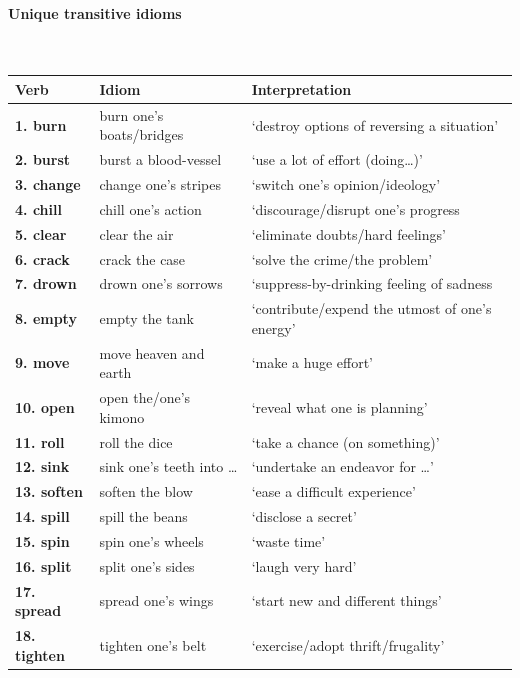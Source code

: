 \documentclass[output=paper]{langsci/langscibook}
\begin{document}
\begin{subappendices}
\paragraph*{Unique transitive idioms}\leavevmode\\[.5\baselineskip]
{\smaller
\begin{tabularx}{\textwidth}{lXX}
{\bfseries Verb} & {\bfseries Idiom} & {\bfseries Interpretation} \\
\midrule
{\bfseries 1. burn}  & burn one’s boats/bridges & ‘destroy options of reversing a situation’ \\
{\bfseries 2. burst}  & burst a blood-vessel & ‘use a lot of effort (doing…)’\\
{\bfseries 3. change} & change one’s stripes~ & ‘switch one’s opinion/ideology’ \\
{\bfseries 4. chill}  & chill one’s action & ‘discourage/disrupt one’s progress \\
{\bfseries 5. clear}  & clear the air & ‘eliminate doubts/hard feelings’\\
{\bfseries 6. crack}  & crack the case & ‘solve the crime/the problem’ \\
{\bfseries 7. drown}  & drown one’s sorrows & ‘suppress-by-drinking feeling of sadness\\
{\bfseries 8. empty}  & empty the tank & ‘contribute/expend the utmost of one’s energy’ \\
{\bfseries 9. move}  & move heaven and earth & ‘make a huge effort’ \\
{\bfseries 10. open}  & open the/one’s kimono & ‘reveal what one is planning’\\
{\bfseries 11. roll}  & roll the dice & ‘take a chance (on something)’ \\
{\bfseries 12. sink}  & sink one’s teeth into \dots & ‘undertake an endeavor for \dots’\\
{\bfseries 13. soften}  & soften the blow & ‘ease a difficult experience’ \\
{\bfseries 14. spill}  & spill the beans & ‘disclose a secret’ \\
{\bfseries 15. spin}  & spin one’s wheels & ‘waste time’\\
{\bfseries 16. split}  & split one’s sides & ‘laugh very hard’\\
{\bfseries 17. spread}  & spread one’s wings & ‘start new and different things’  \\
{\bfseries 18. tighten} & tighten one’s belt & ‘exercise/adopt thrift/frugality’\\
\end{tabularx}
}


\end{subappendices}
\end{document}
